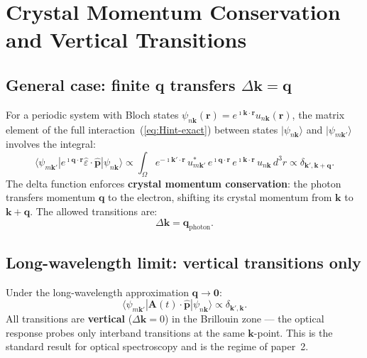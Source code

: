 \documentclass[11pt]{article}
\newcommand{\iunit}{\imath}          %
\newcommand{\Avec}{\mathbf{A}}
\newcommand{\phat}{\hat{\mathbf{p}}}
\begin{document}
\section{Crystal Momentum Conservation and Vertical Transitions}

\subsection{General case: finite q transfers $\Delta\mathbf{k}=\mathbf{q}$}

For a periodic system with Bloch states
$\psi_{n\mathbf{k}}(\mathbf{r})
= e^{\iunit\mathbf{k}\cdot\mathbf{r}}u_{n\mathbf{k}}(\mathbf{r})$,
the matrix element of the full interaction~(\ref{eq:Hint-exact})
between states $|\psi_{n\mathbf{k}}\rangle$ and
$|\psi_{m\mathbf{k}'}\rangle$ involves the integral:
\begin{equation}
  \langle\psi_{m\mathbf{k}'}|
  e^{\iunit\mathbf{q}\cdot\mathbf{r}}\hat{\varepsilon}\cdot\phat
  |\psi_{n\mathbf{k}}\rangle
  \propto
  \int_\Omega\!
  e^{-\iunit\mathbf{k}'\cdot\mathbf{r}}\,u_{m\mathbf{k}'}^*\,
  e^{\iunit\mathbf{q}\cdot\mathbf{r}}\,
  e^{\iunit\mathbf{k}\cdot\mathbf{r}}\,
  u_{n\mathbf{k}}\,d^3r
  \propto \delta_{\mathbf{k}',\mathbf{k}+\mathbf{q}}.
  \label{eq:k-conservation}
\end{equation}
The delta function enforces \textbf{crystal momentum conservation}:
the photon transfers momentum $\mathbf{q}$ to the electron,
shifting its crystal momentum from $\mathbf{k}$ to
$\mathbf{k}+\mathbf{q}$.
The allowed transitions are:
\begin{equation}
  \Delta\mathbf{k} = \mathbf{q}_\mathrm{photon}.
  \label{eq:Deltak}
\end{equation}

\subsection{Long-wavelength limit: vertical transitions only}

Under the long-wavelength approximation $\mathbf{q}\to\mathbf{0}$:
\begin{equation}
  \langle\psi_{m\mathbf{k}'}|
  \Avec(t)\cdot\phat
  |\psi_{n\mathbf{k}}\rangle
  \propto \delta_{\mathbf{k}',\mathbf{k}}.
  \label{eq:vertical}
\end{equation}
All transitions are \textbf{vertical} ($\Delta\mathbf{k}=0$) in
the Brillouin zone --- the optical response probes only
interband transitions at the same $\mathbf{k}$-point.
This is the standard result for optical spectroscopy and is the
regime of paper~2.
\end{document}
